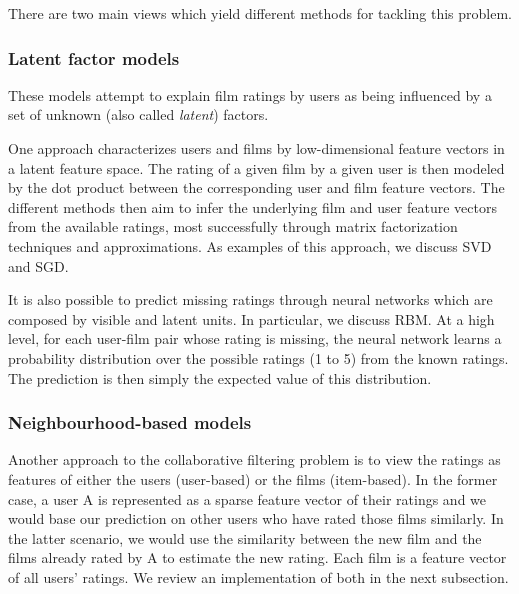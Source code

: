 \documentclass[10pt,conference,compsocconf]{IEEEtran}
\begin{document}
There are two main views which yield different methods for tackling this problem.

\subsubsection*{\textbf{Latent factor models}} 

%
%

These models attempt to explain film ratings by users as being influenced by a set of unknown (also called \emph{latent}) factors.

One approach characterizes users and films by low-dimensional feature vectors in a latent feature space. The rating of a given film by a given user is then modeled by the dot product between the corresponding user and film feature vectors. The different methods then aim to infer the underlying film and user feature vectors from the available ratings, most successfully through matrix factorization techniques and approximations. As examples of this approach, we discuss SVD and SGD.

It is also possible to predict missing ratings through neural networks which are composed by visible and latent units. In particular, we discuss RBM. At a high level, for each user-film pair whose rating is missing, the neural network learns a probability distribution over the possible ratings (1 to 5) from the known ratings. The prediction is then simply the expected value of this distribution.


\subsubsection*{\textbf{Neighbourhood-based models}} Another approach to the collaborative filtering problem is to view the ratings as features of either the users (user-based) or the films (item-based). In the former case, a user A is represented as a sparse feature vector of their ratings and we would base our prediction on other users who have rated those films similarly. In the latter scenario, we would use the similarity between the new film and the films already rated by A to estimate the new rating. Each film is a feature vector of all users' ratings. We review an implementation of both in the next subsection.
\end{document}
